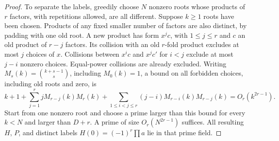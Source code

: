 \begin{proof}
To separate the labels, greedily choose $N$ nonzero roots whose
products of $r$ factors, with repetitions allowed, are all different.
Suppose $k\ge1$ roots have been chosen. Products of any fixed smaller
number of factors are also distinct, by padding with one old root.
A new product has form $x^jc$, with $1\le j\le r$ and $c$ an old
product of $r-j$ factors. Its collision with an old $r$-fold product
excludes at most $j$ choices of $x$. Collisions between $x^ic$ and
$x^jc'$ for $i<j$ exclude at most $j-i$ nonzero choices. Equal-power
collisions are already excluded. Writing
$M_s(k)=\binom{k+s-1}{s}$, including $M_0(k)=1$, a bound on all
forbidden choices, including old roots and zero, is
\[
 k+1+\sum_{j=1}^r jM_{r-j}(k)M_r(k)
 +\sum_{1\le i<j\le r}(j-i)M_{r-i}(k)M_{r-j}(k)
 =O_r(k^{2r-1}).
\]
Start from one nonzero root and choose a prime larger than this bound
for every $k<N$ and larger than $D+r$. A prime of size
$O_r(N^{2r-1})$ suffices. All resulting $H$, $P$, and distinct labels
$H(0)=(-1)^r\prod a$ lie in that prime field.
\end{proof}

